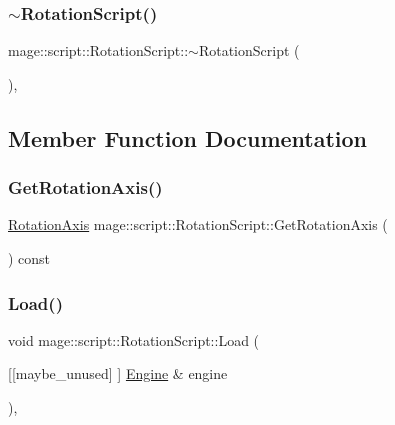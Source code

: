 \subsubsection{\texorpdfstring{$\sim$\+Rotation\+Script()}{~RotationScript()}}
{\footnotesize\ttfamily mage\+::script\+::\+Rotation\+Script\+::$\sim$\+Rotation\+Script (\begin{DoxyParamCaption}{ }\end{DoxyParamCaption})\hspace{0.3cm}{\ttfamily [virtual]}, {\ttfamily [default]}}



\subsection{Member Function Documentation}
\mbox{\label{classmage_1_1script_1_1_rotation_script_ac2ef46249d59b379f47336eb250f3a28}} 
\subsubsection{\texorpdfstring{Get\+Rotation\+Axis()}{GetRotationAxis()}}
{\footnotesize\ttfamily \mbox{\hyperlink{classmage_1_1script_1_1_rotation_script_a54e1d1d0af65f43f5bc5ad65a4b9c00a}{Rotation\+Axis}} mage\+::script\+::\+Rotation\+Script\+::\+Get\+Rotation\+Axis (\begin{DoxyParamCaption}{ }\end{DoxyParamCaption}) const\hspace{0.3cm}{\ttfamily [noexcept]}}

\mbox{\label{classmage_1_1script_1_1_rotation_script_a7da4165e899facc981c0ee5b1f4a4453}} 
\subsubsection{\texorpdfstring{Load()}{Load()}}
{\footnotesize\ttfamily void mage\+::script\+::\+Rotation\+Script\+::\+Load (\begin{DoxyParamCaption}\item[{\mbox{[}\mbox{[}maybe\+\_\+unused\mbox{]} \mbox{]} \mbox{\hyperlink{classmage_1_1_engine}{Engine}} \&}]{engine }\end{DoxyParamCaption})\hspace{0.3cm}{\ttfamily [override]}, {\ttfamily [virtual]}}

